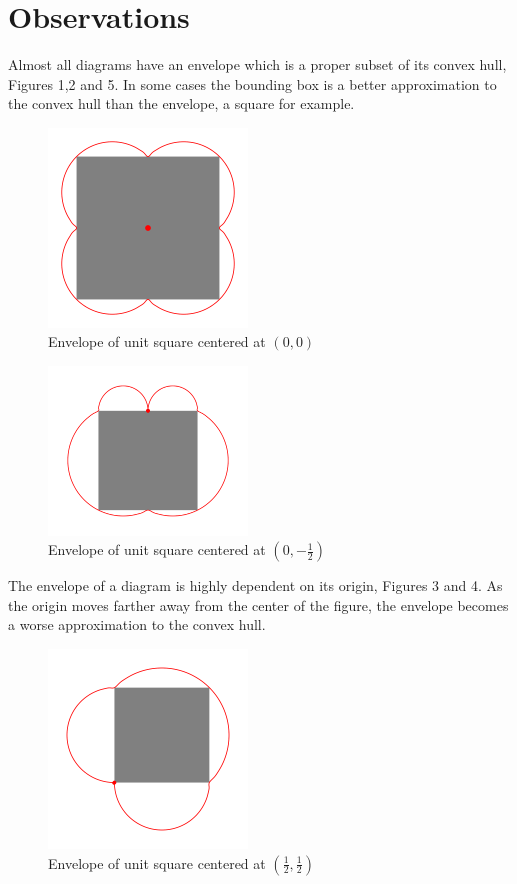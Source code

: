 \documentclass[11pt]{amsart}
\begin{document}
\section{Observations}

Almost all diagrams have an envelope which is a proper subset of its convex hull, Figures 1,2 and 5.
In some cases the bounding box is a better approximation to the convex hull than the envelope, a square
for example.

\begin{figure}[h]
\label{s00}
 \centering
\includegraphics[width=150pt]{sq1_0_0.png}
\caption{Envelope of unit square centered at $(0,0)$}
\end{figure}

\begin{figure}[h]
\label{s05}
 \centering
\includegraphics[width=150pt]{sq1_05.png}
\caption{Envelope of unit square centered at $(0,-\frac{1}{2})$}
\end{figure}

The envelope of a diagram is highly dependent on its origin, Figures 3 and 4.
As the origin moves farther away from the center of the figure, the envelope becomes a 
worse approximation to the convex hull.

\begin{figure}[h]
\label{s55}
 \centering
\includegraphics[width=150pt]{sq1_55.png}
\caption{Envelope of unit square centered at $(\frac{1}{2}, \frac{1}{2})$}
\end{figure}
\end{document}
